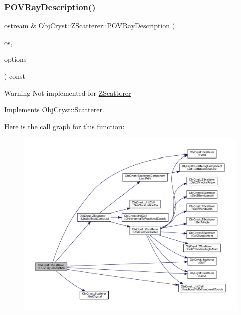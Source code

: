 \subsubsection{\texorpdfstring{POVRayDescription()}{POVRayDescription()}}
{\footnotesize\ttfamily ostream \& Obj\+Cryst\+::\+Z\+Scatterer\+::\+P\+O\+V\+Ray\+Description (\begin{DoxyParamCaption}\item[{ostream \&}]{os,  }\item[{const \mbox{\hyperlink{struct_obj_cryst_1_1_crystal_p_o_v_ray_options}{Crystal\+P\+O\+V\+Ray\+Options}} \&}]{options }\end{DoxyParamCaption}) const\hspace{0.3cm}{\ttfamily [virtual]}}

\begin{DoxyWarning}{Warning}
Not implemented for \mbox{\hyperlink{class_obj_cryst_1_1_z_scatterer}{Z\+Scatterer}} 
\end{DoxyWarning}


Implements \mbox{\hyperlink{class_obj_cryst_1_1_scatterer}{Obj\+Cryst\+::\+Scatterer}}.

Here is the call graph for this function\+:
\nopagebreak
\begin{figure}[H]
\begin{center}
\leavevmode
\includegraphics[width=350pt]{class_obj_cryst_1_1_z_scatterer_abfce23ff84b572acf371cb9dc8cdb09f_cgraph}
\end{center}
\end{figure}
\mbox{\label{class_obj_cryst_1_1_z_scatterer_afb19ed47922cd08146e1d4ce6a661dd3}} 
